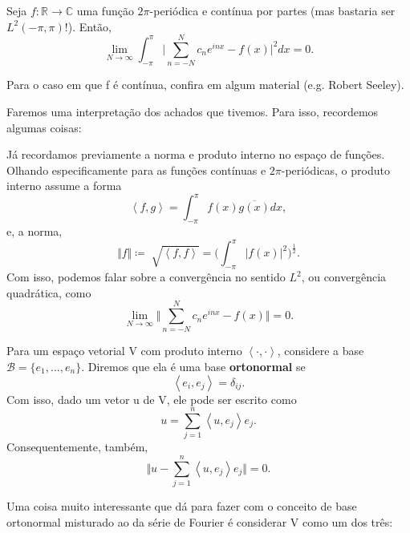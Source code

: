 \documentclass[../pde_notes.tex]{subfiles}
\begin{document}
\begin{theorem*}
	Seja \(f:\mathbb{R}\rightarrow \mathbb{C}\) uma função \(2\pi \)-periódica e contínua por partes (mas bastaria ser \(L^{2}(-\pi , \pi )!\)). Então,
	\[
		\lim_{N\to \infty}\int_{-\pi }^{\pi }\biggl\vert \sum\limits_{n=-N}^{N}c_{n}e^{inx} - f(x) \biggr\vert^{2}dx = 0.
	\]
\end{theorem*}
\begin{proof*}
	Para o caso em que f é contínua, confira em algum material (e.g. Robert Seeley). \qedsymbol
\end{proof*}
Faremos uma interpretação dos achados que tivemos. Para isso, recordemos algumas coisas:
\begin{tcolorbox}[
		skin=enhanced,
		title=Lembrete!,
		after title={\hfill Convergência em \(L^{2}\)},
		fonttitle=\bfseries,
		sharp corners=downhill,
		colframe=black,
		colbacktitle=yellow!75!white,
		colback=yellow!30,
		colbacklower=black,
		coltitle=black,
		drop large lifted shadow
	]
	Já recordamos previamente a norma e produto interno no espaço de funções. Olhando especificamente para as funções contínuas e \(2\pi \)-periódicas, o produto interno assume a forma
	\[
		\left< f, g \right>=\int_{-\pi }^{\pi }f(x)\overline{g(x)}dx,
	\]
	e, a norma,
	\[
		\Vert f \Vert \coloneqq \sqrt[]{\left< f, f \right>}=\biggl(\int_{-\pi }^{\pi }|f(x)|^{2}\biggr)^{\frac{1}{2}}.
	\]
	Com isso, podemos falar sobre a convergência no sentido \(L^{2}\), ou convergência quadrática, como
	\[
		\lim_{N\to \infty}\Vert \sum\limits_{n=-N}^{N} c_{n}e^{inx}-f(x) \Vert=0.
	\]
\end{tcolorbox}
\begin{tcolorbox}[
		skin=enhanced,
		title=Lembrete!,
		after title={\hfill Base ortonormal},
		fonttitle=\bfseries,
		sharp corners=downhill,
		colframe=black,
		colbacktitle=yellow!75!white,
		colback=yellow!30,
		colbacklower=black,
		coltitle=black,
		drop large lifted shadow
	]
	Para um espaço vetorial V com produto interno \(\left< \cdot , \cdot  \right>\), considere a base \(\mathcal{B}=\{e_{1},\dotsc ,e_{n}\}.\) Diremos que ela é uma base \textbf{ortonormal} se
	\[
		\left< e_{i}, e_{j} \right>=\delta_{ij}.
	\]
	Com isso, dado um vetor u de V, ele pode ser escrito como
	\[
		u=\sum\limits_{j=1}^{n}\left< u, e_{j} \right>e_{j}.
	\]
	Consequentemente, também,
	\[
		\biggl\Vert u-\sum\limits_{j=1}^{n}\left< u, e_{j} \right>e_{j} \biggr\Vert = 0.
	\]
\end{tcolorbox}
Uma coisa muito interessante que dá para fazer com o conceito de base ortonormal misturado ao da série de Fourier é considerar V como um dos três:
\end{document}

